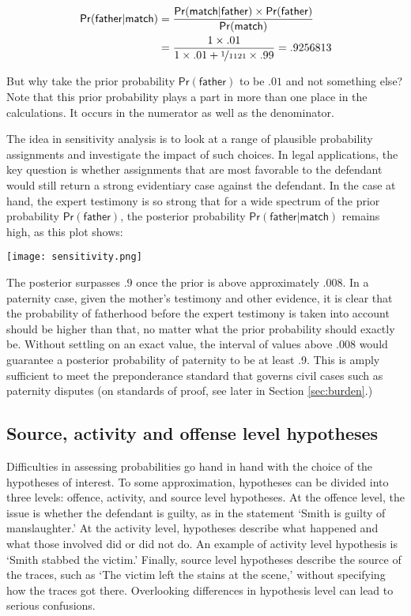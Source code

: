 \documentclass{article}
\newcommand{\pr}{\mathsf{Pr}}
\begin{document}
\begin{align*}
\pr(\textsf{father}\vert \textsf{match}) & = 
	\frac{
		\pr(\textsf{match}\vert \textsf{father}) \times \pr(\textsf{father})
		}
		{
		\pr(\textsf{match})
		} \\ &=
	\frac{
		1 \times  .01
	}
	{
		1 \times .01 + \nicefrac{1}{1121} \times .99
		}	= .9256813
	\end{align*}

\noindent But why take the prior probability $\pr(\textsf{father})$ to be $.01$ and not something else?
Note that this prior probability plays a part in more than one place in the calculations. It occurs in the numerator as well as the denominator. 

The idea in sensitivity analysis is to look at a range of plausible probability assignments and investigate the impact of such choices.
In legal applications, the key question is whether assignments that are most favorable to the defendant would still return a strong evidentiary case against the defendant. 
In the case at hand, the expert testimony is so strong that for a wide spectrum of the prior probability $\pr(\textsf{father})$, the posterior probability $\pr(\textsf{father} \vert \textsf{match})$ remains high, as this plot shows:
\begin{center}
	\texttt{[image: sensitivity.png]}
\end{center}
\noindent The posterior surpasses $.9$ once the prior is above approximately $.008$. In a paternity case, given the mother's testimony and other evidence, it is clear that the probability of fatherhood before the expert testimony is taken into account should be higher than that, no matter what the prior probability should exactly be. Without settling on an exact value, the interval of values above .008 would guarantee a posterior probability of paternity to be at least .9. This is amply sufficient to meet the preponderance standard that governs civil cases such as paternity disputes (on standards of proof, see later in Section \ref{sec:burden}.) 







\subsection{Source, activity and offense level hypotheses}
 \label{subsec:levels}



Difficulties in assessing  probabilities go hand in hand with the choice of the hypotheses of interest. To some approximation, hypotheses can be divided into three levels: offence, activity, and source level hypotheses. At the offence level, the issue is whether the defendant is guilty, as in the statement `Smith is guilty of manslaughter.'  At the activity level, hypotheses describe what happened and what those involved did or did not do. An example of activity level hypothesis is `Smith stabbed the victim.' Finally, source level hypotheses describe the source of the traces, such as  `The victim left the stains at the scene,' without specifying how the traces got there. Overlooking differences in hypothesis level can lead to serious confusions. 
\end{document}
